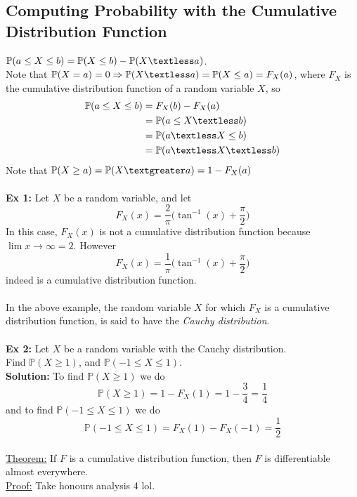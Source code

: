 \documentclass{article}
\newcommand{\ti}[1]{\textit{#1}}
\newcommand{\bbP}{\mathbb{P}}
\newcommand{\lt}{\textless}
\newcommand{\gt}{\textgreater}
\newcommand{\imply}{\Rightarrow}
\begin{document}
\subsection{Computing Probability with the Cumulative Distribution Function}
$\bbP(a \leq X \leq b) = \bbP(X \leq b) - \bbP(X \lt a)$.\\
Note that $\bbP(X=a) = 0 \imply \bbP(X\lt a) = \bbP(X\leq a) = F_{X}(a)$, where $F_{X}$ is the cumulative distribution function of a random variable $X$, so
\begin{align*}
	\bbP(a \leq X \leq b) &= F_{X}(b) - F_{X}(a)\\
					&= \bbP(a \leq X \lt b)\\
					&= \bbP(a \lt X \leq b)\\
					&= \bbP(a \lt X \lt b)
\end{align*}
Note that $\bbP(X \geq a) = \bbP(X \gt a) = 1-F_{X}(a)$\\\\
\textbf{Ex 1:} Let $X$ be a random variable, and let
\[F_{X}(x) = \frac{2}{\pi}\Big(\tan^{-1}(x) + \frac{\pi}{2}\Big)\]
In this case, $F_{X}(x)$ is not a cumulative distribution function because $\lim{x\to\infty} = 2$. However
\[F_{X}(x) = \frac{1}{\pi}\Big(\tan^{-1}(x) + \frac{\pi}{2}\Big)\] indeed is a cumulative distribution function.\\\\
In the above example, the random variable $X$ for which $F_{X}$ is a cumulative distribution function, is said to have the \ti{Cauchy distribution}.\\\\
\textbf{Ex 2:} Let $X$ be a random variable with the Cauchy distribution.\\
Find $\bbP(X \geq 1)$, and $\bbP(-1 \leq X \leq 1)$.\\
\textbf{Solution:} To find $\bbP(X \geq 1)$ we do
\[\bbP(X \geq 1) = 1-F_{X}(1) = 1-\frac{3}{4} = \frac{1}{4}\]
and to find $\bbP(-1 \leq X \leq 1)$ we do
\[\bbP(-1 \leq X \leq 1) = F_{X}(1) - F_{X}(-1) = \frac{1}{2}\]\\
\underline{Theorem:} If $F$ is a cumulative distribution function, then $F$ is differentiable almost everywhere.\\
\underline{Proof:} Take honours analysis 4 lol.
\end{document}
